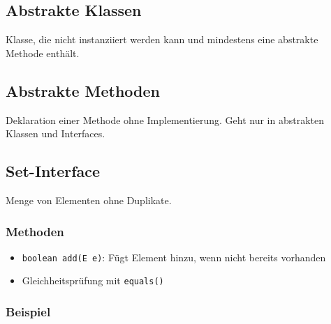 \begin{minipage}[t]{0.54\columnwidth}
    \subsection{Abstrakte Klassen}
    Klasse, die nicht instanziiert werden kann und mindestens eine abstrakte Methode enthält.
\end{minipage}\hfill%
\begin{minipage}[t]{0.45\columnwidth}
    \subsection{Abstrakte Methoden}
    Deklaration einer Methode ohne Implementierung. Geht nur in abstrakten Klassen und Interfaces.
    
\end{minipage}

\vspace{-7mm}
\subsection{Set-Interface}
Menge von Elementen ohne Duplikate.
\subsubsection{Methoden}
\begin{itemize}
    \item \lstinline{boolean add(E e)}: Fügt Element hinzu, wenn nicht bereits vorhanden
    \item Gleichheitsprüfung mit \lstinline{equals()}
\end{itemize}

\subsubsection{Beispiel}

